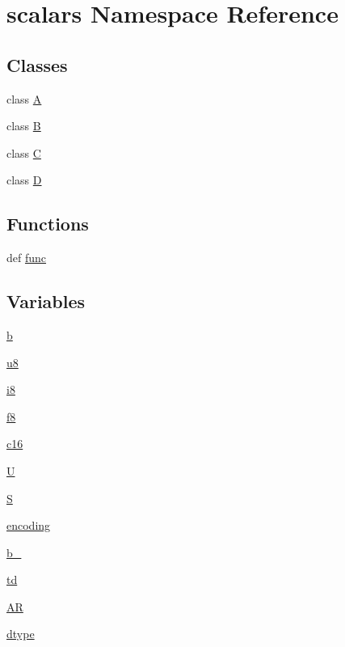 \hypertarget{namespacescalars}{}\section{scalars Namespace Reference}
\label{namespacescalars}
\subsection*{Classes}
\begin{DoxyCompactItemize}
\item 
class \hyperlink{classscalars_1_1A}{A}
\item 
class \hyperlink{classscalars_1_1B}{B}
\item 
class \hyperlink{classscalars_1_1C}{C}
\item 
class \hyperlink{classscalars_1_1D}{D}
\end{DoxyCompactItemize}
\subsection*{Functions}
\begin{DoxyCompactItemize}
\item 
def \hyperlink{namespacescalars_a435ae74fefaf096e3f5dcb7f77598890}{func}
\end{DoxyCompactItemize}
\subsection*{Variables}
\begin{DoxyCompactItemize}
\item 
\hyperlink{namespacescalars_a152cabaf7d1b86c5d72318d9b9aab3e5}{b}
\item 
\hyperlink{namespacescalars_a5b1f566967d01927bc4183f20f46e084}{u8}
\item 
\hyperlink{namespacescalars_a3226d347b78931ed1ea72f6332e0666b}{i8}
\item 
\hyperlink{namespacescalars_a3b0a5b4ca89cb53df4baf4134d00eed0}{f8}
\item 
\hyperlink{namespacescalars_a7cba89a6dffb4c98a36ae81a6979b231}{c16}
\item 
\hyperlink{namespacescalars_a5e4d6965926b1b3988c05a384e8232b1}{U}
\item 
\hyperlink{namespacescalars_a241c9098593162929766b5dc03ab80ae}{S}
\item 
\hyperlink{namespacescalars_a52e5634b59d78575f2cefc9b016bb31a}{encoding}
\item 
\hyperlink{namespacescalars_a8df944499ca4be2dbcf87e3c10e17c78}{b\+\_\+}
\item 
\hyperlink{namespacescalars_a9c0f27fb65375ea1a95aa306c4609c6a}{td}
\item 
\hyperlink{namespacescalars_a52f33462232f5f28eaae066501b094e7}{AR}
\item 
\hyperlink{namespacescalars_a257ed886dcb27e8bb10f4ee935637905}{dtype}
\end{DoxyCompactItemize}



